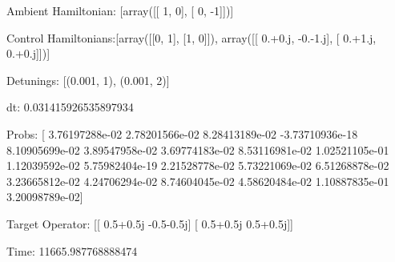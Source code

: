 \documentclass{article}
\begin{document}
    

\newpage

Ambient Hamiltonian: [array([[ 1,  0],
       [ 0, -1]])]

Control Hamiltonians:[array([[0, 1],
       [1, 0]]), array([[ 0.+0.j, -0.-1.j],
       [ 0.+1.j,  0.+0.j]])]

Detunings: [(0.001, 1), (0.001, 2)]

 dt: 0.031415926535897934

Probs: [  3.76197288e-02   2.78201566e-02   8.28413189e-02  -3.73710936e-18
   8.10905699e-02   3.89547958e-02   3.69774183e-02   8.53116981e-02
   1.02521105e-01   1.12039592e-02   5.75982404e-19   2.21528778e-02
   5.73221069e-02   6.51268878e-02   3.23665812e-02   4.24706294e-02
   8.74604045e-02   4.58620484e-02   1.10887835e-01   3.20098789e-02]

Target Operator: [[ 0.5+0.5j -0.5-0.5j]
 [ 0.5+0.5j  0.5+0.5j]]

Time: 11665.987768888474
\end{document}
